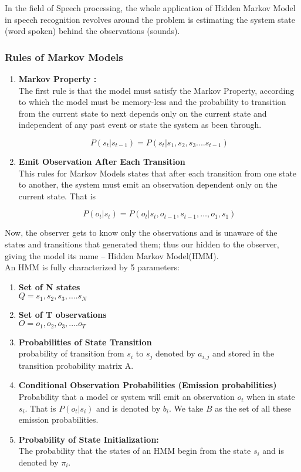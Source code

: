 \documentclass[10pt,twocolumn,letterpaper]{article}
\begin{document}
In the field of Speech processing, the whole application of Hidden Markov Model in speech recognition revolves around the problem is estimating the system state (word spoken) behind the observations (sounds). \\


\subsubsection{Rules of Markov Models}
\begin{enumerate}
    \item \textbf{Markov Property : } \\
    The first rule is that the model must satisfy the Markov Property, according to which the model must be memory-less and the probability to transition from the current state to next depends only on the current state and independent of any past event or state the system as been through.
    
    $$P(s_t|s_{t-1}) = P(s_t|s_1,s_2,s_3....s_{t-1}) $$
    \item \textbf{Emit Observation After Each Transition} \\
    This rules for Markov Models states that after each transition from one state to another, the system must emit an observation dependent only on the current state. That is 
    
    $$P(o_{t}| s_{t})= P(o_t| s_t ,o_{t-1} ,s_{t-1} ,…,o_1 ,s_1 )$$
\end{enumerate}

Now, the observer gets to know only the observations and is unaware of the states and transitions that generated them; thus our hidden to the observer, giving the model its name – Hidden Markov Model(HMM). \\

An HMM is fully characterized by 5 parameters: 
\begin{enumerate}
    \item \textbf{Set of N states}\\
    $Q = s_1, s_2, s_3, .... s_N$
    \item \textbf{Set of T observations} \\
    $O = o_1, o_2, o_3,.... o_T$
    \item \textbf{Probabilities of State Transition}\\
    probability of transition from $s_i$ to $s_j$ denoted by $a_{i,j}$ and stored in the transition probability matrix A.
    \item \textbf{Conditional Observation Probabilities (Emission probabilities) } \\
    Probability that a model or system will emit an observation $o_t$ when in state $s_i$. That is $P(o_t | s_i)$ and is denoted by $b_{i}$. We take $B$ as the set of all these emission probabilities.
    \item \textbf{Probability of State Initialization:} \\
    The probability that the states of an HMM begin from the state $s_i$ and is denoted by $\pi_i$.
\end{enumerate}
\end{document}
